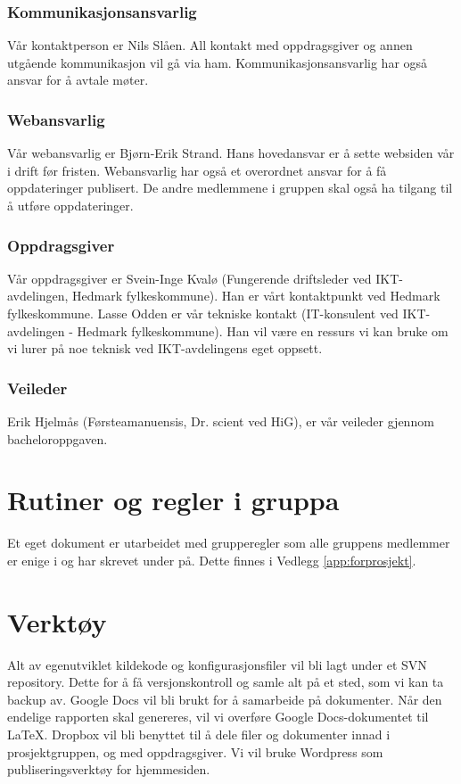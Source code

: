 \subsubsection{Kommunikasjonsansvarlig}
Vår kontaktperson er Nils Slåen. All kontakt med oppdragsgiver og annen utgående kommunikasjon vil gå via ham. Kommunikasjonsansvarlig har også ansvar for å avtale møter.

\subsubsection{Webansvarlig}
Vår webansvarlig er Bjørn-Erik Strand. Hans hovedansvar er å sette websiden vår i drift før fristen. Webansvarlig har også et overordnet ansvar for å få oppdateringer publisert. De andre medlemmene i gruppen skal også ha tilgang til å utføre oppdateringer.

\subsubsection{Oppdragsgiver}
Vår oppdragsgiver er Svein-Inge Kvalø (Fungerende driftsleder ved IKT-avdelingen, Hedmark fylkeskommune). Han er vårt kontaktpunkt ved Hedmark fylkeskommune. Lasse Odden er vår tekniske kontakt (IT-konsulent ved IKT-avdelingen - Hedmark fylkeskommune). Han vil være en ressurs vi kan bruke om vi lurer på noe teknisk ved IKT-avdelingens eget oppsett.

\subsubsection{Veileder}
Erik Hjelmås (Førsteamanuensis, Dr. scient ved HiG), er vår veileder gjennom bacheloroppgaven.

\section{Rutiner og regler i gruppa}
Et eget dokument er utarbeidet med grupperegler som alle gruppens medlemmer er enige i og har skrevet under på. Dette finnes i Vedlegg \ref{app:forprosjekt}.

\section{Verktøy}
Alt av egenutviklet kildekode og konfigurasjonsfiler vil bli lagt under et SVN repository. Dette for å få versjonskontroll og samle alt på et sted, som vi kan ta backup av. Google Docs vil bli brukt for å samarbeide på dokumenter. Når den endelige rapporten skal genereres, vil vi overføre Google Docs-dokumentet til \LaTeX. Dropbox vil bli benyttet til å dele filer og dokumenter innad i prosjektgruppen, og med oppdragsgiver. Vi vil bruke Wordpress som publiseringsverktøy for hjemmesiden.

